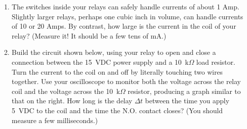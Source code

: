 \begin{enumerate}[wide]
\item The switches inside your relays can safely handle currents of about 1 Amp.  Slightly larger relays, perhaps one cubic inch in volume, can handle currents of 10 or 20 Amps.  By contrast, how large is the current in the coil of your relay?  (Measure it!  It should be a few tens of mA.)


\item Build the circuit shown below, using your relay to open and close a connection between the 15~VDC power supply and a 10~k$\Omega$ load resistor.  
Turn the current to the coil on and off by literally touching two wires together.  
Use your oscilloscope to monitor both the voltage across the relay coil and the voltage across the 10~k$\Omega$ resistor, producing a graph similar to that on the right.  
How long is the delay $\Delta t$ between the time you apply 5~VDC to the coil and the time the N.O. contact closes?
(You should measure a few milliseconds.)


\end{enumerate}

